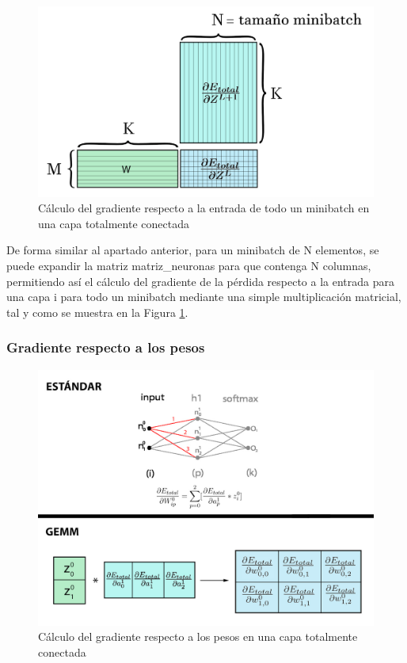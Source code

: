 \begin{figure}[H]
	\centering
	\includegraphics[scale=0.25]{imagenes/gemm_fully_back_input_minibatch.jpg}  
	\caption{Cálculo del gradiente respecto a la entrada de todo un minibatch en una capa totalmente conectada}
	\label{fig:gemm_fully_back_input_minibatch}
\end{figure}

De forma similar al apartado anterior, para un minibatch de N elementos, se puede expandir la matriz matriz\_neuronas para que contenga N columnas, permitiendo así el cálculo del gradiente de la pérdida respecto a la entrada para una capa i para todo un minibatch mediante una simple multiplicación matricial, tal y como se muestra en la Figura \ref{fig:gemm_fully_back_input_minibatch}.

\subsubsection{Gradiente respecto a los pesos}
\begin{figure}[H]
	\centering
	\includegraphics[scale=0.3]{imagenes/gemm_fully_back_w.jpg}  
	\caption{Cálculo del gradiente respecto a los pesos en una capa totalmente conectada}
	\label{fig:gemm_fully_back_w}
\end{figure}

